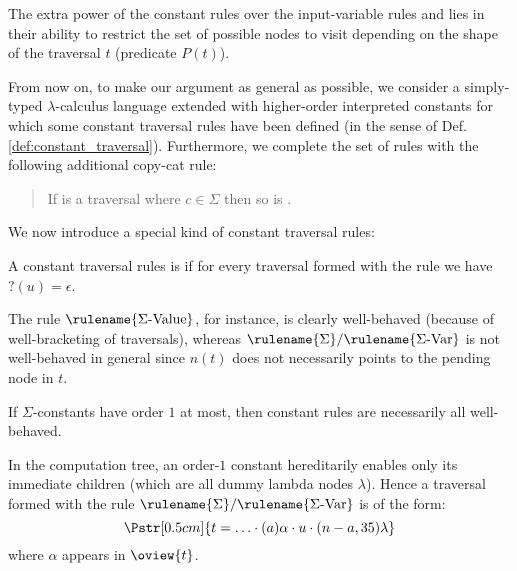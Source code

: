 \begin{remark}
The extra power of the constant rules over the input-variable rules
 and  lies in their
ability to restrict the set of possible nodes to visit depending on
the shape of the traversal $t$ (predicate $P(t)$).
\end{remark}

From now on, to make our argument as general as possible, we
consider a simply-typed $\lambda$-calculus language extended with
higher-order interpreted constants for which some constant traversal
rules have been defined (in the sense of Def.
\ref{def:constant_traversal}). Furthermore, we complete the set of
rules with the following additional copy-cat rule:
\begin{quote}
 If  is a
traversal where $c\in\Sigma$ then so is .
\end{quote}


We now introduce a special kind of constant traversal rules:
\begin{definition}
\label{def:wellbehaved_traversal} A constant traversal rules is
     if
    for every traversal   formed with the rule
    we have $?(u) = \epsilon$.
\end{definition}

The rule $\rulename{\Sigma\mbox{-Value}}$, for instance, is clearly
well-behaved (because of well-bracketing of traversals), whereas
$\rulename{\Sigma}/\rulename{\Sigma\mbox{-Var}}$ is not well-behaved
in general since $n(t)$ does not necessarily points to the pending
node in $t$.

\begin{lemma}
\label{lem:sigma_order1_are_wellbehaved} If $\Sigma$-constants have
order $1$ at most, then constant rules are necessarily all
well-behaved.
\end{lemma}
\proof In the computation tree, an order-$1$ constant hereditarily
enables only its immediate children (which are all dummy lambda
nodes $\lambda$). Hence a traversal formed with the rule
$\rulename{\Sigma}/\rulename{\Sigma\mbox{-Var}}$ is of the form:
$$\Pstr[0.5cm]{ t = \ldots \cdot (a){\alpha} \cdot u \cdot
 (n-a,35){\lambda}}$$
where $\alpha$ appears in $\oview{t}$.

